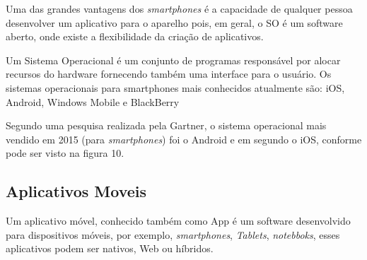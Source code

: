 Uma das grandes vantagens dos \textit{smartphones} é a capacidade de qualquer pessoa desenvolver um aplicativo para o aparelho pois, em geral, o SO é um software aberto, onde existe a flexibilidade da criação de aplicativos.

Um Sistema Operacional é um conjunto de programas responsável por alocar recursos do hardware fornecendo também uma interface para o usuário. Os sistemas operacionais para smartphones mais conhecidos atualmente são: iOS, Android, Windows Mobile e BlackBerry \cite{oqsmar}

Segundo uma pesquisa realizada pela Gartner, o sistema operacional mais vendido em 2015 (para \textit{smartphones}) foi o Android e em segundo o iOS, conforme pode ser visto na figura 10. \cite{gar}
\begin{figure}[h!]
		\centering
	\end{figure}

\subsection{Aplicativos Moveis}
Um aplicativo móvel, conhecido também como App é um software desenvolvido para dispositivos móveis, por exemplo, \textit{smartphones},  \textit{Tablets}, \textit{notebboks}, esses aplicativos podem ser nativos, Web ou híbridos. \cite{dif}

